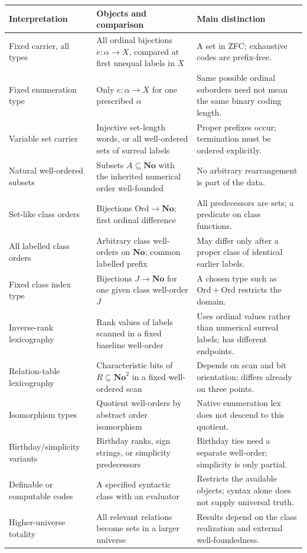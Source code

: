 \documentclass[11pt]{article}
\theoremstyle{definition}
\theoremstyle{remark}
\newcommand{\No}{\mathbf{No}}
\newcommand{\Ord}{\mathrm{Ord}}
\begin{document}
\begin{longtable}{@{}>{\raggedright\arraybackslash}p{}>{\raggedright\arraybackslash}p{}>{\raggedright\arraybackslash}p{}@{}}
\toprule
Interpretation & Objects and comparison & Main distinction\\
\midrule\endhead
Fixed carrier, all types & All ordinal bijections $e:\alpha\to X$, compared at first unequal labels in $X$ & A set in ZFC; exhaustive codes are prefix-free.\\
Fixed enumeration type & Only $e:\alpha\to X$ for one prescribed $\alpha$ & Same possible ordinal suborders need not mean the same binary coding length.\\
Variable set carrier & Injective set-length words, or all well-ordered sets of surreal labels & Proper prefixes occur; termination must be ordered explicitly.\\
Natural well-ordered subsets & Subsets $A\subseteq\No$ with the inherited numerical order well-founded & No arbitrary rearrangement is part of the data.\\
Set-like class orders & Bijections $\Ord\to\No$; first ordinal difference & All predecessors are sets; a predicate on class functions.\\
All labelled class orders & Arbitrary class well-orders on $\No$; common labelled prefix & May differ only after a proper class of identical earlier labels.\\
Fixed class index type & Bijections $J\to\No$ for one given class well-order $J$ & A chosen type such as $\Ord+\Ord$ restricts the domain.\\
Inverse-rank lexicography & Rank values of labels scanned in a fixed baseline well-order & Uses ordinal values rather than numerical surreal labels; has different endpoints.\\
Relation-table lexicography & Characteristic bits of $R\subseteq\No^2$ in a fixed well-ordered scan & Depends on scan and bit orientation; differs already on three points.\\
Isomorphism types & Quotient well-orders by abstract order isomorphism & Native enumeration lex does not descend to this quotient.\\
Birthday/simplicity variants & Birthday ranks, sign strings, or simplicity predecessors & Birthday ties need a separate well-order; simplicity is only partial.\\
Definable or computable codes & A specified syntactic class with an evaluator & Restricts the available objects; syntax alone does not supply universal truth.\\
Higher-universe totality & All relevant relations become sets in a larger universe & Results depend on the class realization and external well-foundedness.\\
\bottomrule
\end{longtable}
\end{document}
